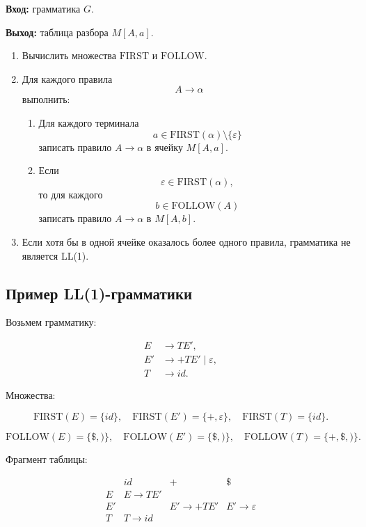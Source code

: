 \documentclass[12pt,a4paper]{article}
\begin{document}
\textbf{Вход:} грамматика $G$.

\textbf{Выход:} таблица разбора $M[A,a]$.

\begin{enumerate}
    \item Вычислить множества $\mathrm{FIRST}$ и $\mathrm{FOLLOW}$.
    \item Для каждого правила
    \[
    A \to \alpha
    \]
    выполнить:
    \begin{enumerate}
        \item Для каждого терминала
        \[
        a \in \mathrm{FIRST}(\alpha)\setminus\{\varepsilon\}
        \]
        записать правило $A \to \alpha$ в ячейку $M[A,a]$.
        \item Если
        \[
        \varepsilon \in \mathrm{FIRST}(\alpha),
        \]
        то для каждого
        \[
        b \in \mathrm{FOLLOW}(A)
        \]
        записать правило $A \to \alpha$ в $M[A,b]$.
    \end{enumerate}
    \item Если хотя бы в одной ячейке оказалось более одного правила, грамматика не является LL(1).
\end{enumerate}

\subsection{Пример LL(1)-грамматики}

Возьмем грамматику:

\[
\begin{aligned}
E &\to TE',\\
E' &\to +TE' \mid \varepsilon,\\
T &\to id.
\end{aligned}
\]

Множества:

\[
\mathrm{FIRST}(E)=\{id\},
\quad
\mathrm{FIRST}(E')=\{+,\varepsilon\},
\quad
\mathrm{FIRST}(T)=\{id\}.
\]

\[
\mathrm{FOLLOW}(E)=\{\$,)\},
\quad
\mathrm{FOLLOW}(E')=\{\$,)\},
\quad
\mathrm{FOLLOW}(T)=\{+,\$,)\}.
\]

Фрагмент таблицы:

\[
\begin{array}{c|ccc}
 & id & + & \$ \\
\hline
E  & E\to TE' & & \\
E' & & E'\to +TE' & E'\to \varepsilon \\
T  & T\to id & & \\
\end{array}
\]
\end{document}
